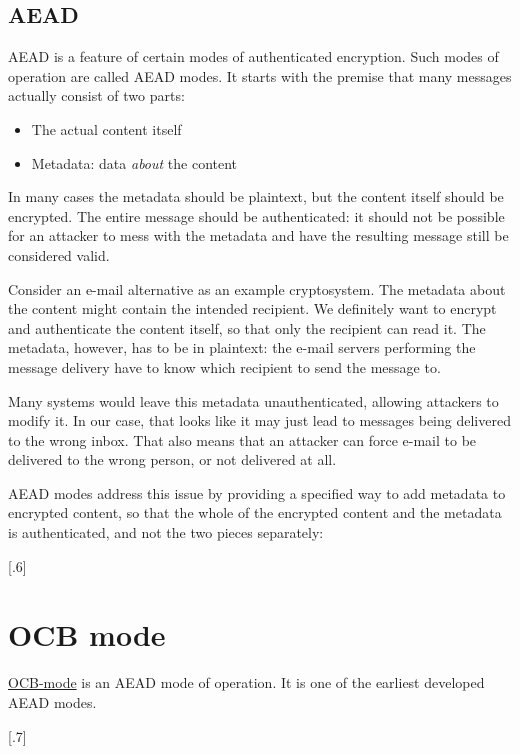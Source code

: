 \documentclass[11pt,ebook,table,dvipsnames]{memoir}
\begin{document}
\subsection{\Gls{AEAD}}
\label{sec-2-7-7-1}

\Gls{AEAD} is a feature of certain modes of authenticated encryption.
Such modes of operation are called \glspl{AEAD mode}. It starts with
the premise that many messages actually consist of two parts:

\begin{itemize}
\item The actual content itself
\item Metadata: data \emph{about} the content
\end{itemize}

In many cases the metadata should be plaintext, but the content itself
should be encrypted. The entire message should be authenticated: it
should not be possible for an attacker to mess with the metadata and
have the resulting message still be considered valid.

Consider an e-mail alternative as an example cryptosystem. The
metadata about the content might contain the intended recipient. We
definitely want to encrypt and authenticate the content itself, so
that only the recipient can read it. The metadata, however, has to be
in plaintext: the e-mail servers performing the message delivery have
to know which recipient to send the message to.

Many systems would leave this metadata unauthenticated, allowing
attackers to modify it. In our case, that looks like it may just lead
to messages being delivered to the wrong inbox. That also means that
an attacker can force e-mail to be delivered to the wrong person, or
not delivered at all.

\Gls{AEAD} modes address this issue by providing a specified way to
add metadata to encrypted content, so that the whole of the encrypted
content and the metadata is authenticated, and not the two pieces
separately:

[.6]
\section{\label{OCB-mode}OCB mode}
\label{sec-2-7-8}

\hyperref[OCB mode]{OCB-mode} is an \gls{AEAD} mode of operation. It is one of the earliest
developed \glspl{AEAD mode}.

[.7]
\end{document}
